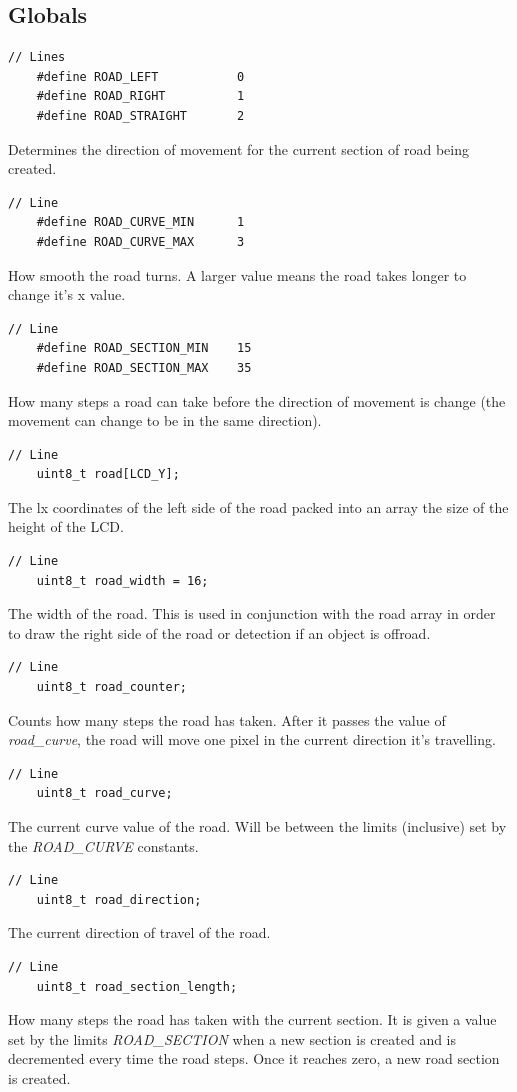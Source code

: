 \documentclass{article}
\begin{document}
\subsection*{Globals}
\begin{lstlisting}[style=CStyle]
	// Lines
	#define ROAD_LEFT           0
	#define ROAD_RIGHT          1
	#define ROAD_STRAIGHT       2
\end{lstlisting}
Determines the direction of movement for the current section of road being created.
\begin{lstlisting}[style=CStyle]
	// Line 
	#define ROAD_CURVE_MIN      1
	#define ROAD_CURVE_MAX      3
\end{lstlisting}
How smooth the road turns. A larger value means the road takes longer to change it's x value. 
\begin{lstlisting}[style=CStyle]
	// Line 
	#define ROAD_SECTION_MIN    15
	#define ROAD_SECTION_MAX    35
\end{lstlisting}
How many steps a road can take before the direction of movement is change (the movement can change to be in the same direction). 
\begin{lstlisting}[style=CStyle]
	// Line 
	uint8_t road[LCD_Y]; 
\end{lstlisting}
The lx coordinates of the left side of the road packed into an array the size of the height of the LCD. 
\begin{lstlisting}[style=CStyle]
	// Line 
	uint8_t road_width = 16; 
\end{lstlisting}
The width of the road. This is used in conjunction with the road array in order to draw the right side of the road or detection if an object is offroad.
\begin{lstlisting}[style=CStyle]
	// Line 
	uint8_t road_counter;
\end{lstlisting}
Counts how many steps the road has taken. After it passes the value of \emph{road\_curve}, the road will move one pixel in the current direction it's travelling.
\begin{lstlisting}[style=CStyle]
	// Line 
	uint8_t road_curve;
\end{lstlisting}
The current curve value of the road. Will be between the limits (inclusive) set by the \emph{ROAD\_CURVE} constants.
\begin{lstlisting}[style=CStyle]
	// Line 
	uint8_t road_direction;
\end{lstlisting}
The current direction of travel of the road.
\begin{lstlisting}[style=CStyle]
	// Line 
	uint8_t road_section_length;
\end{lstlisting}
How many steps the road has taken with the current section. It is given a value set by the limits \emph{ROAD\_SECTION} when a new section is created and is decremented every time the road steps. Once it reaches zero, a new road section is created. 
\newpage
\end{document}

